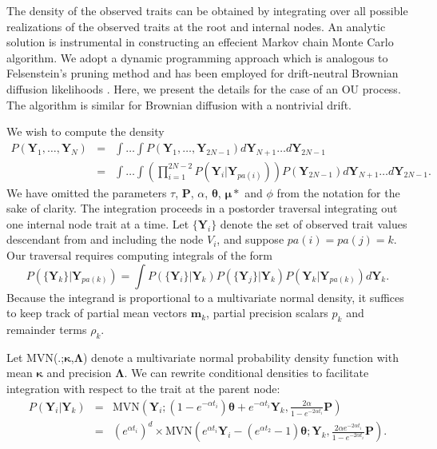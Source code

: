 \documentclass[12pt]{article}
\begin{document}
The density of the observed traits can be obtained by integrating over all possible realizations of the observed traits 
at the root and internal nodes.  An analytic solution is instrumental in constructing an effecient Markov chain Monte Carlo algorithm.
We adopt a dynamic programming approach which is
analogous to Felsenstein's pruning method \citep{Felsenstein81} and has been employed for drift-neutral
Brownian diffusion likelihoods \citep{Lemey2010} .  Here, we present the details for the case of an OU process.  The algorithm is similar 
for Brownian diffusion with a nontrivial drift. 
\par
We wish to compute the density
\begin{eqnarray}
P(\textbf{Y}_1,\dots,\textbf{Y}_{N} ) & = & \int  \dots \int P(\textbf{Y}_1,\dots,\textbf{Y}_{2N-1}) d \textbf{Y}_{N+1} \dots d\textbf{Y}_{2N-1} \\
& = & \int \dots \int \left( \prod_{i=1}^{2N-2} P(\textbf{Y}_i | \textbf{Y}_{pa(i)} ) \right) P(\textbf{Y}_{2N-1} ) d \textbf{Y}_{N+1} \dots d\textbf{Y}_{2N-1} .
\end{eqnarray}
We have omitted the parameters $\tau$, $\textbf{P}$, $\alpha$, $\boldsymbol \theta$, $\boldsymbol \mu*$ and $\phi$ from the notation for the sake
of clarity.  The integration proceeds in a postorder traversal integrating out one internal node trait at a time.  Let $\{\textbf{Y}_i \}$ denote the set 
of observed trait values descendant from and including the node $V_i$, and suppose $pa(i) = pa(j) = k$.  Our traversal requires computing integrals
of the form
\begin{equation}
P( \{\textbf{Y}_k \} | \textbf{Y}_{pa(k)} ) = \int P(\{\textbf{Y}_i \} | \textbf{Y}_k) P(\{\textbf{Y}_j \} | \textbf{Y}_k) P(\textbf{Y}_k | \textbf{Y}_{pa(k)}) d \textbf{Y}_k .
\end{equation}
Because the integrand is proportional to a multivariate normal density, it suffices to keep track of partial mean vectors $\textbf{m}_k$, partial precision scalars $p_k$ 
and remainder terms $\rho_k$.
\par
Let MVN(.;$\boldsymbol \kappa$,$\boldsymbol \Lambda$) denote a multivariate normal probability density function with mean $\boldsymbol \kappa$ and 
precision $\boldsymbol \Lambda$.  We can rewrite conditional densities to facilitate integration with respect to the trait at the parent node:
\begin{eqnarray}
P(\textbf{Y}_i | \textbf{Y}_k) & = & \mbox{MVN} \left(\textbf{Y}_i;( 1 - e^{- \alpha t_i} ) \boldsymbol \theta + e^{- \alpha t_i} \textbf{Y}_{k},
\frac{2 \alpha}{1-e^{-2 \alpha t_i}} \textbf{P} \right) \\
& = & (e^{\alpha t_i})^d \times \mbox{MVN}\left(e^{\alpha t_i} \textbf{Y}_i - (e^{\alpha t_2} -1) \boldsymbol \theta;\textbf{Y}_k, \frac{2 \alpha e^{-2 \alpha t_i} }{1-e^{-2 \alpha t_i}} \textbf{P}  \right).
\end{eqnarray}
\end{document}
